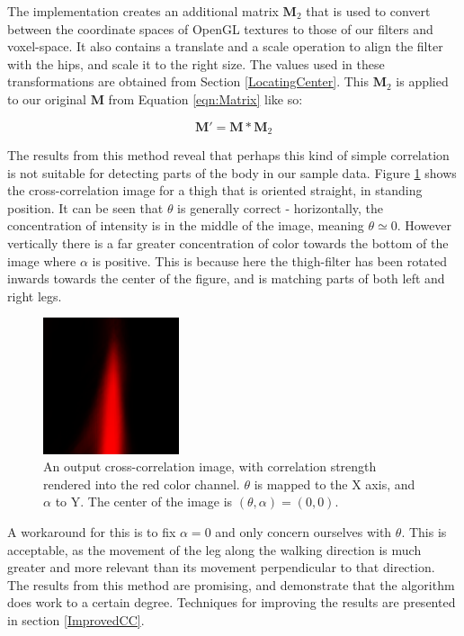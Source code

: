 The implementation creates an additional matrix $\mathbf{M}_2$ that is used to convert between the coordinate spaces of OpenGL textures to those of our filters and voxel-space.
It also contains a translate and a scale operation to align the filter with the hips, and scale it to the right size.
The values used in these transformations are obtained from Section \ref{LocatingCenter}.
This $\mathbf{M}_2$ is applied to our original $\mathbf{M}$ from Equation \ref{eqn:Matrix} like so:

\begin{equation}
	\mathbf{M}' = \mathbf{M} * \mathbf{M}_2
\end{equation}

\bigskip
\noindent The results from this method reveal that perhaps this kind of simple correlation is not suitable for detecting parts of the body in our sample data.
Figure \ref{ParameterSpace} shows the cross-correlation image for a thigh that is oriented straight, in standing position.
It can be seen that $\theta$ is generally correct - horizontally, the concentration of intensity is in the middle of the image, meaning $\theta \simeq 0$.
However vertically there is a far greater concentration of color towards the bottom of the image where $\alpha$ is positive.
This is because here the thigh-filter has been rotated inwards towards the center of the figure, and is matching parts of both left and right legs.

\begin{figure}[tb]
	\vspace{-10pt}
	\centering
	\includegraphics[height=4cm]{parameterspace.png}
	\caption{An output cross-correlation image, with correlation strength rendered into the red color channel.
		$\theta$ is mapped to the X axis, and $\alpha$ to Y.
		The center of the image is $(\theta, \alpha) = (0,0)$.}
	\label{ParameterSpace}
\end{figure}

A workaround for this is to fix $\alpha = 0$ and only concern ourselves with $\theta$.
This is acceptable, as the movement of the leg along the walking direction is much greater and more relevant \cite{GaitBook} than its movement perpendicular to that direction.
The results from this method are promising, and demonstrate that the algorithm does work to a certain degree.
Techniques for improving the results are presented in section \ref{ImprovedCC}.


